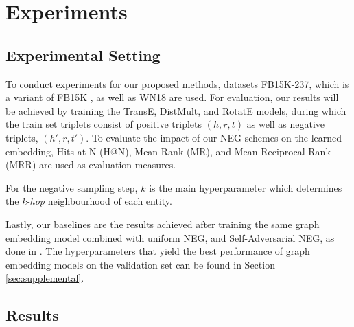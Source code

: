 \section{Experiments}
\label{sec:results}

\subsection{Experimental Setting}

To conduct experiments for our proposed methods, datasets FB15K-237, which is a variant of FB15K \cite{bollacker2008freebase}, as well as WN18 \cite{miller1995wordnet} are used. For evaluation, our results will be achieved by training the TransE, DistMult, and RotatE models, during which the train set triplets consist of positive triplets $(h , r, t)$ as well as negative triplets, $(h', r, t')$. To evaluate the impact of our NEG schemes on the learned embedding, Hits at N (H@N),  Mean Rank (MR), and Mean Reciprocal Rank (MRR) are used as evaluation measures. 


For the negative sampling step, $k$ is the main hyperparameter which determines the \emph{k-hop} neighbourhood of each entity. 

Lastly, our baselines are the results achieved after training the same graph embedding model combined with uniform NEG, and Self-Adversarial NEG, as done in \cite{sun2019rotate}. The hyperparameters that yield the best performance of graph embedding models on the validation set can be found in Section \ref{sec:supplemental}.

\subsection{Results}


